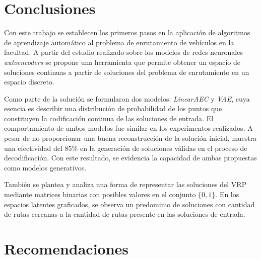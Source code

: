 \chapter*{Conclusiones}\label{chapter:conclusions}

Con este trabajo se establecen los primeros pasos en la aplicación de algoritmos de aprendizaje automático al problema de enrutamiento de vehículos en la facultad. A partir del estudio realizado sobre los modelos de redes neuronales \textit{autoencoders} se propone una herramienta que permite obtener un espacio de soluciones continuas a partir de soluciones del problema de enrutamiento en un espacio discreto. 

Como parte de la solución se formularon dos modelos: \textit{LinearAEC} y \textit{VAE}, cuya esencia es describir una distribución de probabilidad de los puntos que constituyen la codificación continua de las soluciones de entrada. El comportamiento de ambos modelos fue similar en los experimentos realizados. A pesar de no proporcionar una buena reconstrucción de la solución inicial,  muestra una efectividad del $85\%$ en la generación de soluciones válidas en el proceso de decodificación. Con este resultado, se evidencia la capacidad de ambas propuestas como modelos generativos.

También se plantea y analiza una forma de representar las soluciones del VRP mediante matrices binarias con posibles valores en el conjunto $\{0, 1\}$. En los espacios latentes graficados, se observa un predominio de soluciones con cantidad de rutas cercanas a la cantidad de rutas presente en las soluciones de entrada. 






\chapter*{Recomendaciones}\label{chapter:recomendaciones}

